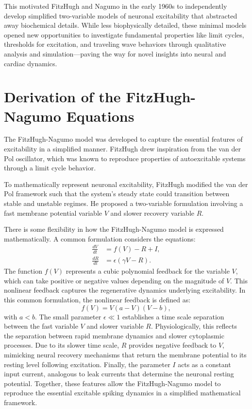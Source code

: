 This motivated FitzHugh and Nagumo in the early 1960s to independently develop simplified two-variable models of neuronal excitability that abstracted away biochemical details. While less biophysically detailed, these minimal models opened new opportunities to investigate fundamental properties like limit cycles, thresholds for excitation, and traveling wave behaviors through qualitative analysis and simulation—paving the way for novel insights into neural and cardiac dynamics.

\section{Derivation of the FitzHugh-Nagumo Equations}

The FitzHugh-Nagumo model was developed to capture the essential features of excitability in a simplified manner. FitzHugh drew inspiration from the van der Pol oscillator, which was known to reproduce properties of autoexcitable systems through a limit cycle behavior.

To mathematically represent neuronal excitability, FitzHugh modified the van der Pol framework such that the system's steady state could transition between stable and unstable regimes. He proposed a two-variable formulation involving a fast membrane potential variable $V$ and slower recovery variable $R$.

There is some flexibility in how the FitzHugh-Nagumo model is expressed mathematically. A common formulation considers the equations:
\begin{align}
\frac{dV}{dt} &= f(V) - R + I, \\
\frac{dR}{dt} &= \epsilon(\gamma V - R).
\end{align}
The function $f(V)$ represents a cubic polynomial feedback for the variable $V$, which can take positive or negative values depending on the magnitude of $V$. This nonlinear feedback captures the regenerative dynamics underlying excitability. In this common formulation, the nonlinear feedback is defined as:
\begin{equation*}
f(V) = V (a - V) (V - b),
\end{equation*}
with $a < b$. The small parameter $\epsilon \ll 1$ establishes a time scale separation between the fast variable $V$ and slower variable $R$. Physiologically, this reflects the separation between rapid membrane dynamics and slower cytoplasmic processes. Due to its slower time scale, $R$ provides negative feedback to $V$, mimicking neural recovery mechanisms that return the membrane potential to its resting level following excitation. Finally, the parameter $I$ acts as a constant input current, analogous to leak currents that determine the neuronal resting potential. Together, these features allow the FitzHugh-Nagumo model to reproduce the essential excitable spiking dynamics in a simplified mathematical framework. 

